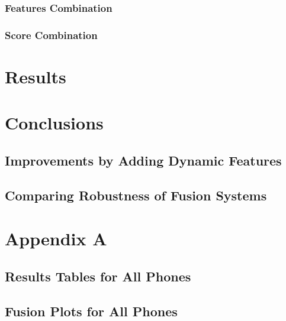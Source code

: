 \documentclass[11pt,a4paper]{tesis}
\begin{document}
		\subsection{Features Combination}
		\subsection{Score Combination}

\chapter{Results}
	

\chapter{Conclusions}
	\section{Improvements by Adding Dynamic Features}
	\section{Comparing Robustness of Fusion Systems}

\chapter{Appendix A}
	\section{Results Tables for All Phones}
		
	\section{Fusion Plots for All Phones}
		

\printbibliography
 
\end{document}
